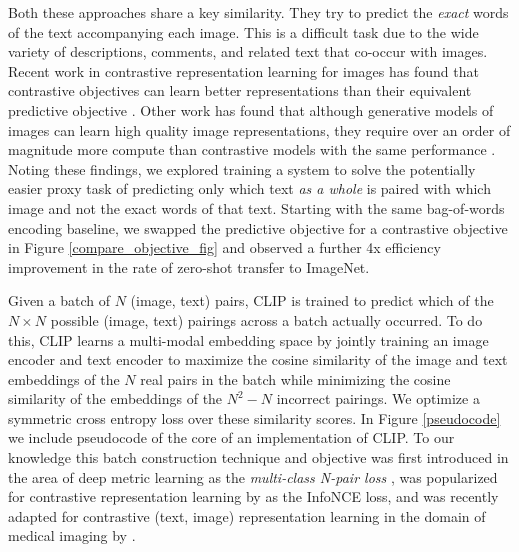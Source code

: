 Both these approaches share a key similarity. They try to predict the \textit{exact} words of the text accompanying each image. This is a difficult task due to the wide variety of descriptions, comments, and related text that co-occur with images. Recent work in contrastive representation learning for images has found that contrastive objectives can learn better representations than their equivalent predictive objective \citep{tian2019contrastive}. Other work has found that although generative models of images can learn high quality image representations, they require over an order of magnitude more compute than contrastive models with the same performance \citep{chen2020generative}. Noting these findings, we explored training a system to solve the potentially easier proxy task of predicting only which text \textit{as a whole} is paired with which image and not the exact words of that text. Starting with the same bag-of-words encoding baseline, we swapped the predictive objective for a contrastive objective in Figure \ref{compare_objective_fig} and observed a further 4x efficiency improvement in the rate of zero-shot transfer to ImageNet.

Given a batch of $N$ (image, text) pairs, CLIP is trained to predict which of the $N\times N$ possible (image, text) pairings across a batch actually occurred. To do this, CLIP learns a multi-modal embedding space by jointly training an image encoder and text encoder to maximize the cosine similarity of the image and text embeddings of the $N$ real pairs in the batch while minimizing the cosine similarity of the embeddings of the $N^2-N$ incorrect pairings. We optimize a symmetric cross entropy loss over these similarity scores. In Figure \ref{pseudocode} we include pseudocode of the core of an implementation of CLIP. To our knowledge this batch construction technique and objective was first introduced in the area of deep metric learning as the \textit{multi-class N-pair loss} \citet{sohn2016improved}, was popularized for contrastive representation learning by \citet{oord2018representation} as the InfoNCE loss, and was recently adapted for contrastive (text, image) representation learning in the domain of medical imaging by \citet{zhang2020contrastive}.

